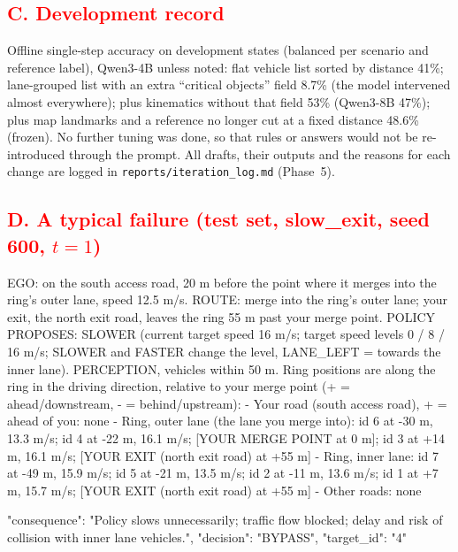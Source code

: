 \documentclass[11pt]{article}
\newcommand{\rev}[1]{\textcolor{red}{#1}}
\newenvironment{revblock}{\color{red}}{}
\begin{document}
\subsection*{\rev{C. Development record}}
\begin{revblock}
Offline single-step accuracy on development states (balanced per scenario and reference label), Qwen3-4B unless noted:
flat vehicle list sorted by distance 41\%; lane-grouped list with an extra ``critical objects'' field 8.7\% (the model
intervened almost everywhere); plus kinematics without that field 53\% (Qwen3-8B 47\%); plus map landmarks and a
reference no longer cut at a fixed distance 48.6\% (frozen). No further tuning was done, so that rules or answers would
not be re-introduced through the prompt. All drafts, their outputs and the reasons for each change are logged in
\texttt{reports/iteration\_log.md} (Phase~5).
\end{revblock}

\subsection*{\rev{D. A typical failure (test set, slow\_exit, seed 600, $t=1$)}}
\begin{ModelInput}[formatcom=\color{red}]
EGO: on the south access road, 20 m before the point where it merges into the ring's outer lane,
    speed 12.5 m/s.
ROUTE: merge into the ring's outer lane; your exit, the north exit road, leaves the ring 55 m
    past your merge point.
POLICY PROPOSES: SLOWER (current target speed 16 m/s; target speed levels 0 / 8 / 16 m/s; SLOWER
    and FASTER change the level, LANE_LEFT = towards the inner lane).
PERCEPTION, vehicles within 50 m. Ring positions are along the ring in the driving direction,
    relative to your merge point (+ = ahead/downstream, - = behind/upstream):
- Your road (south access road), + = ahead of you: none
- Ring, outer lane (the lane you merge into): id 6 at -30 m, 13.3 m/s; id 4 at -22 m, 16.1 m/s;
    [YOUR MERGE POINT at 0 m]; id 3 at +14 m, 16.1 m/s; [YOUR EXIT (north exit road) at +55 m]
- Ring, inner lane: id 7 at -49 m, 15.9 m/s; id 5 at -21 m, 13.5 m/s; id 2 at -11 m, 13.6 m/s;
    id 1 at +7 m, 15.7 m/s; [YOUR EXIT (north exit road) at +55 m]
- Other roads: none
\end{ModelInput}

\begin{ModelResponse}[formatcom=\color{red}]
{"consequence": "Policy slows unnecessarily; traffic flow blocked; delay and risk of collision
    with inner lane vehicles.", "decision": "BYPASS", "target_id": "4"}
\end{ModelResponse}
\end{document}
